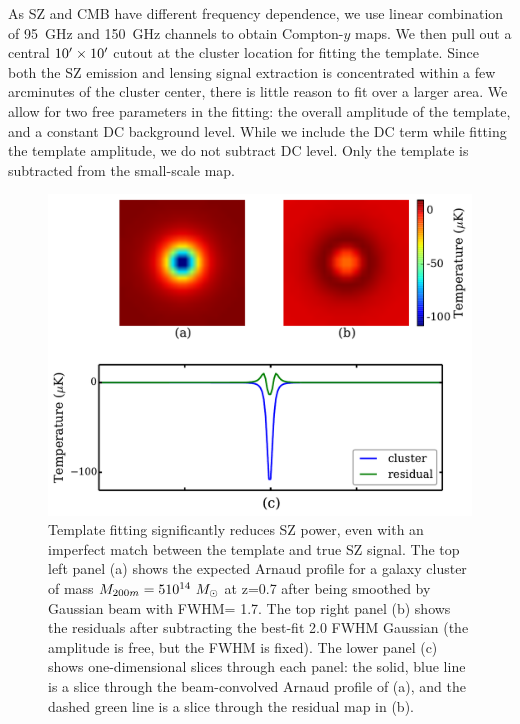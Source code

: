 As SZ and CMB have different frequency dependence, we use linear combination of 95\, GHz and 150\, GHz channels to obtain Compton-$y$ maps.
We then pull out a central $10^{\prime} \times 10^{\prime}$ cutout at the cluster location for fitting the template. 
Since both the SZ emission and lensing signal extraction is concentrated within a few arcminutes of the cluster center, there is little reason to fit over a larger area. 
We allow for two free parameters in the fitting: the overall amplitude of the template, and a constant DC background level. 
While we include the DC term while fitting the template amplitude, we do not subtract DC level. 
Only the template is subtracted from the small-scale map.
\begin{figure}[ht]
\includegraphics[width=\linewidth, keepaspectratio]{figs/template_fitting.pdf}
 \caption{Template fitting significantly reduces SZ power, even with an imperfect match between the template and true SZ signal. 
The top left panel (a) shows the expected Arnaud profile for a galaxy cluster of mass $M_{200m} = 5 10^{14}~ {M}_{\odot}$ at z=0.7 after being smoothed by Gaussian beam with FWHM= 1\arcmin.7.
The top right panel (b) shows the residuals after subtracting the best-fit 2\arcmin.0 FWHM Gaussian (the amplitude is free, but the FWHM is fixed). 
The lower panel (c) shows one-dimensional slices through each panel: the solid, blue line is a slice through the beam-convolved Arnaud profile of (a), and the dashed green line is a slice through the residual map in (b). 
 } 
\label{fig:residual}
\end{figure}


